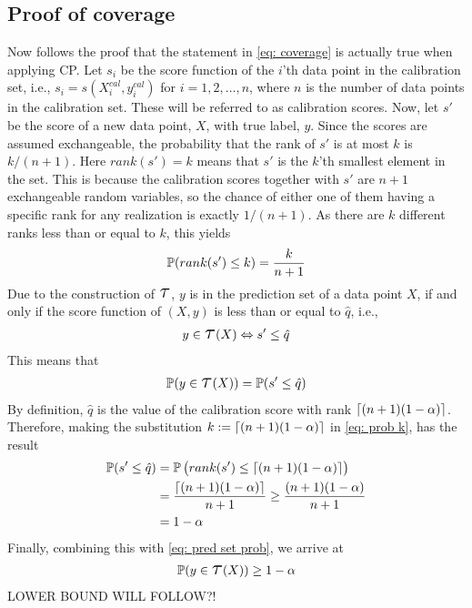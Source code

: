 \subsection{Proof of coverage}
Now follows the proof that the statement in \cref{eq: coverage} is actually true when applying CP. Let $s_i$ be the score function of the $i$'th data point in the calibration set, i.e., $s_i=s(X_i^{cal},y_i^{cal})$ for $i=1,2,\dots,n$, where $n$ is the number of data points in the calibration set. These will be referred to as calibration scores.
Now, let $s'$ be the score of a new data point, $X$, with true label, $y$. Since the scores are assumed exchangeable, the probability that the rank of $s'$ is at most $k$ is $k/(n+1)$. Here $rank(s')=k$ means that $s'$ is the $k$'th smallest element in the set. This is because the calibration scores together with $s'$ are $n+1$ exchangeable random variables, so the chance of either one of them having a specific rank for any realization is exactly $1/(n+1)$. As there are $k$ different ranks less than or equal to $k$, this yields
\begin{gather}
    \operatorname*{\mathbb{P}}(rank(s')\leq k) = \frac{k}{n+1}
    \label{eq: prob k}
\end{gather}
Due to the construction of $\Tau$, $y$ is in the prediction set of a data point $X$, if and only if the score function of $(X,y)$ is less than or equal to $\hat q$, i.e., 
\begin{gather*}
    y\in\Tau(X) \Leftrightarrow s' \leq \hat q
\end{gather*}
This means that
\begin{gather}
    \doubleP(y\in\Tau(X)) = \doubleP(s' \leq \hat q)
    \label{eq: pred set prob}
\end{gather}
By definition, $\hat q$ is the value of the calibration score with rank $\lceil {(n+1)(1-\alpha)} \rceil$. Therefore, making the substitution $k := \lceil {(n+1)(1-\alpha)} \rceil$ in \cref{eq: prob k}, has the result
\begin{align*}
    \operatorname*{\mathbb{P}}(s'\leq \hat q)
    &= \operatorname*{\mathbb{P}}\big(rank(s') \leq \lceil {(n+1)(1-\alpha)} \rceil\big)\\
    &= \frac{\lceil {(n+1)(1-\alpha)} \rceil}{n+1}
    \geq \frac{(n+1)(1-\alpha)}{n+1}\\
    &= 1-\alpha
\end{align*}
Finally, combining this with \cref{eq: pred set prob}, we arrive at
\begin{gather}
    \doubleP(y\in\Tau(X)) \geq 1-\alpha
\end{gather}
LOWER BOUND WILL FOLLOW?!
%
%
%
%
%
%
%
%
